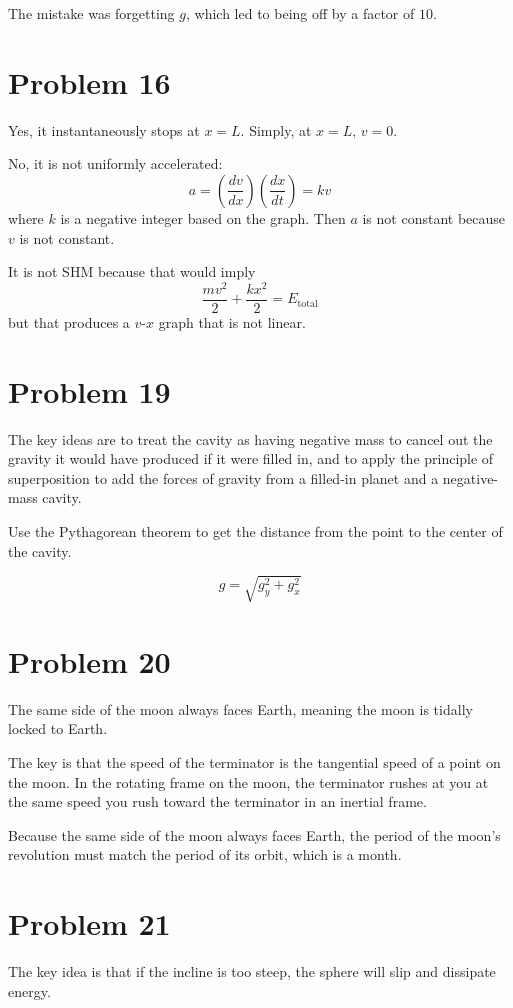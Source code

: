 \documentclass[11pt]{article}
\begin{document}
The mistake was forgetting $g$, which led to being off by a factor of $10$.

\section*{Problem 16}
Yes, it instantaneously stops at $x=L$. Simply, at $x=L$, $v=0$.

\noindent No, it is not uniformly accelerated:
\[
a=\left(\frac{dv}{dx}\right)\left(\frac{dx}{dt}\right)=kv
\]
where $k$ is a negative integer based on the graph. Then $a$ is not constant because $v$ is not constant.

It is not SHM because that would imply
\[
\frac{mv^2}{2}+\frac{kx^2}{2}=E_{\text{total}}
\]
but that produces a $v$-$x$ graph that is not linear.

\section*{Problem 19}
\hspace*{\parindent} The key ideas are to treat the cavity as having negative mass to cancel out the gravity it would have produced if it were filled in, and to apply the principle of superposition to add the forces of gravity from a filled-in planet and a negative-mass cavity.

Use the Pythagorean theorem to get the distance from the point to the center of the cavity.

\[
g=\sqrt{g_y^2+g_x^2}
\]

\section*{Problem 20}
\hspace*{\parindent} The same side of the moon always faces Earth, meaning the moon is tidally locked to Earth.

The key is that the speed of the terminator is the tangential speed of a point on the moon. In the rotating frame on the moon, the terminator rushes at you at the same speed you rush toward the terminator in an inertial frame.

Because the same side of the moon always faces Earth, the period of the moon's revolution must match the period of its orbit, which is a month.

\section*{Problem 21}
\hspace*{\parindent} The key idea is that if the incline is too steep, the sphere will slip and dissipate energy.
\end{document}
